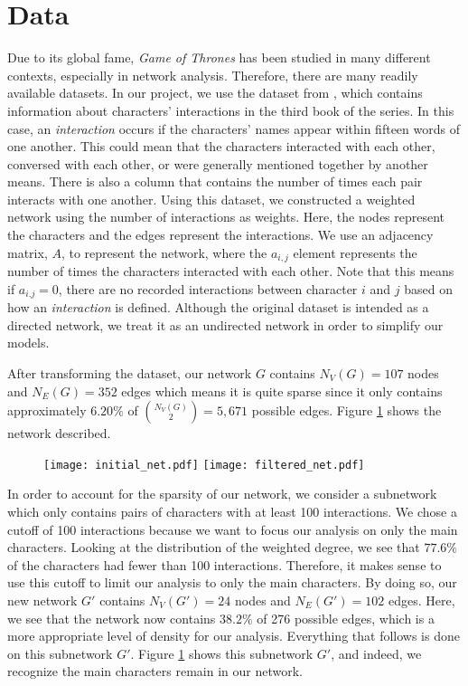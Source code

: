 \documentclass{article}
\begin{document}
\section{Data}\label{Data}
Due to its global fame, \textit{Game of Thrones} has been studied in many different contexts, especially in network analysis. Therefore, there are many readily available datasets. In our project, we use the dataset from \cite{beveridge2016network}, which contains information about characters' interactions in the third book of the series. In this case, an \textit{interaction} occurs if the characters' names appear within fifteen words of one another. This could mean that the characters interacted with each other, conversed with each other, or were generally mentioned together by another means. There is also a column that contains the number of times each pair interacts with one another. Using this dataset, we constructed a weighted network using the number of interactions as weights. Here, the nodes represent the characters and the edges represent the interactions. We use an adjacency matrix, $A$, to represent the network, where the $a_{i,j}$ element represents the number of times the characters interacted with each other. Note that this means if $a_{i.j} = 0$, there are no recorded interactions between character $i$ and $j$ based on how an \textit{interaction} is defined. Although the original dataset is intended as a directed network, we treat it as an undirected network in order to simplify our models.

After transforming the dataset, our network $G$ contains $N_V(G) = 107$ nodes and $N_E(G) = 352$ edges which means it is quite sparse since it only contains approximately $6.20\%$ of $\binom{N_V(G)}{2} = 5,671$ possible edges. Figure \ref{filtered_net} shows the network described. 
\begin{figure}[h]
	\centering
	\vspace*{-3cm}
	\hspace*{-4cm}
	\texttt{[image: initial\_net.pdf]}
	\texttt{[image: filtered\_net.pdf]}
	\hspace*{-4cm}
	\vspace*{-2cm}
  \caption{}
  \label{filtered_net}
\end{figure}
In order to account for the sparsity of our network, we consider a subnetwork which only contains pairs of characters with at least 100 interactions. We chose a cutoff of 100 interactions because we want to focus our analysis on only the main characters. Looking at the distribution of the weighted degree, we see that $77.6\%$ of the characters had fewer than 100 interactions. Therefore, it makes sense to use this cutoff to limit our analysis to only the main characters. By doing so, our new network $G'$ contains $N_V(G') = 24$ nodes and $N_E(G') = 102$ edges. Here, we see that the network now contains $38.2\%$ of 276 possible edges, which is a more appropriate level of density for our analysis. Everything that follows is done on this subnetwork $G'$. Figure \ref{filtered_net} shows this subnetwork $G'$, and indeed, we recognize the main characters remain in our network.
\end{document}
